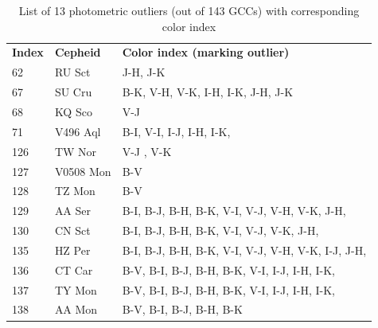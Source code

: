 \begin{table}[H]
  \centering
  \caption{List of 13 photometric outliers (out of 143 GCCs) with corresponding color index}\label{outliers}
  {\small
  \begin{tabular}{lll}
    \textbf{Index} & \textbf{Cepheid}& \textbf{Color index (marking outlier)}\\
    62 & RU Sct &  J-H, J-K\\
    67 & SU Cru &   B-K, V-H,  V-K, I-H, I-K, J-H, J-K\\
    68 & KQ Sco & V-J \\
    71 & V496 Aql & B-I, V-I,  I-J, I-H, I-K, \\
    126 & TW Nor & V-J , V-K \\
    127 & V0508 Mon & B-V\\
    128 & TZ Mon &  B-V\\
    129 & AA Ser & B-I, B-J,  B-H, B-K, V-I,  V-J,  V-H,  V-K, J-H, \\
    130 & CN Sct &  B-I, B-J,  B-H, B-K, V-I,  V-J,  V-K, J-H, \\
    135 & HZ Per &  B-I, B-J,  B-H, B-K, V-I,  V-J,  V-H,  V-K,  I-J, J-H, \\
    136 & CT Car &  B-V, B-I, B-J, B-H, B-K,  V-I,  I-J, I-H, I-K, \\
    137 & TY Mon &  B-V, B-I, B-J, B-H, B-K, V-I,  I-J, I-H, I-K, \\
    138 & AA Mon &   B-V, B-I, B-J, B-H, B-K \\
 \end{tabular}
 }
\end{table}


